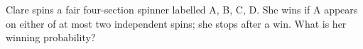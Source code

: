 Clare spins a fair four-section spinner labelled A, B, C, D. She wins if A appears on either of at most two independent spins; she stops after a win. What is her winning probability?
